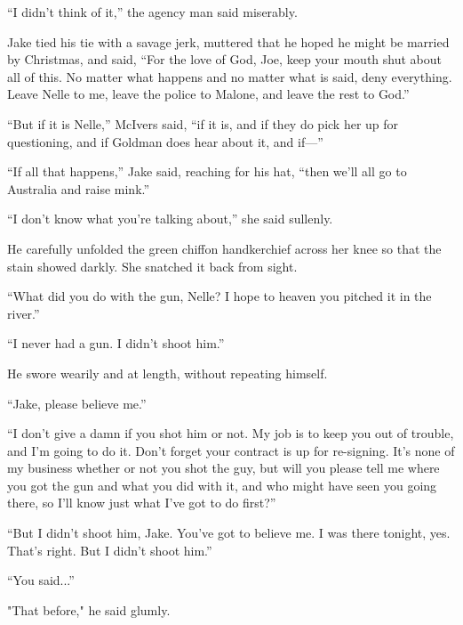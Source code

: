 \documentclass{novel}
\begin{document}
“I didn’t think of it,” the agency man said miserably.

Jake tied his tie with a savage jerk, muttered that he hoped he might be married by Christmas, and said, “For the love of God, Joe, keep your mouth shut about all of this. No matter what happens and no matter what is said, deny everything. Leave Nelle to me, leave the police to Malone, and leave the rest to God.”

“But if it is Nelle,” McIvers said, “if it is, and if they do pick her up for questioning, and if Goldman does hear about it, and if—”

“If all that happens,” Jake said, reaching for his hat, “then we’ll all go to Australia and raise mink.”

\begin{ChapterStart}
\vspace{3\nbs}
\end{ChapterStart}

“I don’t know what you’re talking about,” she said sullenly.

He carefully unfolded the green chiffon handkerchief across her knee so that the stain showed darkly. She snatched it back from sight.

“What did you do with the gun, Nelle? I hope to heaven you pitched it in the river.”

“I never had a gun. I didn’t shoot him.”

He swore wearily and at length, without repeating himself.

“Jake, please believe me.”

“I don’t give a damn if you shot him or not. My job is to keep you out of trouble, and I’m going to do it. Don’t forget your contract is up for re-signing. It’s none of my business whether or not you shot the guy, but will you please tell me where you got the gun and what you did with it, and who might have seen you going there, so I’ll know just what I’ve got to do first?”

“But I didn’t shoot him, Jake. You’ve got to believe me. I was there tonight, yes. That’s right. But I didn’t shoot him.”

“You said...”

"That before," he said glumly.
\end{document}
